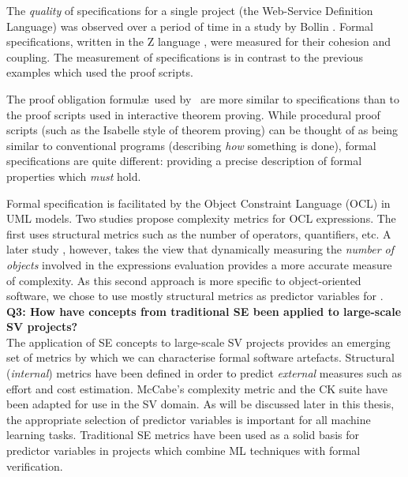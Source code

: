 The \textit{quality} of specifications for a single project (the Web-Service Definition Language) was observed over a period of time in a study by Bollin \cite{Zspecs}. Formal specifications, written in the Z language \cite{Zlang}, were measured for their cohesion and coupling. The measurement of specifications is in contrast to the previous examples \cite{Aspinall2016, CostIndicator} which used the proof scripts. 

The proof obligation formul\ae~used by \where~are more similar to specifications than to the proof scripts used in interactive theorem proving.
While procedural proof scripts (such as the Isabelle style of theorem proving) can be thought of as being similar to conventional programs (describing \textit{how} something is done), formal specifications are quite different: providing a precise description of formal properties which \textit{must} hold.
     
Formal specification is facilitated by the Object Constraint Language (OCL) \cite{OCL} in UML models. 
Two studies propose complexity metrics for OCL expressions. 
The first \cite{TowardsOCL} uses structural metrics such as the number of operators, quantifiers, etc. 
A later study \cite{OCLalt}, however, takes the view that dynamically measuring the \textit{number of objects} involved in the expressions evaluation provides a more accurate measure of complexity. 
As this second approach is more specific to object-oriented software, we chose to use mostly structural metrics as predictor variables for \where. \\

\textbf{Q3: How have concepts from traditional SE been applied to large-scale SV projects?} \\
The application of SE concepts to large-scale SV projects provides an emerging set of metrics by which we can characterise formal software artefacts.   
Structural (\textit{internal}) metrics have been defined in order to predict \textit{external} measures such as effort and cost estimation. 
McCabe's complexity metric and the CK suite have been adapted for use in the SV domain.
As will be discussed later in this thesis, the appropriate selection of predictor variables is important for all machine learning tasks. 
Traditional SE metrics have been used as a solid basis for predictor variables in projects which combine ML techniques with formal verification.
       
